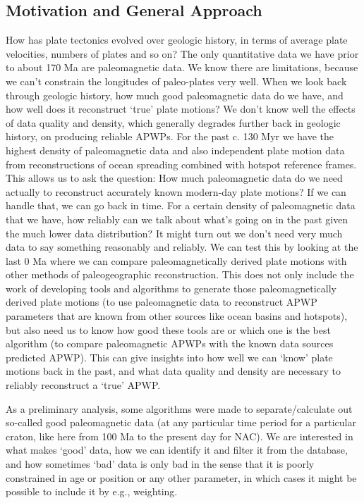 \subsection{Motivation and General Approach}

How has plate tectonics evolved over geologic history, in terms of average plate
velocities, numbers of plates and so on? The only quantitative data we have
prior to about 170 Ma are paleomagnetic data. We know there are limitations,
because we can't constrain the longitudes of paleo-plates very well. When we
look back through geologic history, how much good paleomagnetic data do we have,
and how well does it reconstruct `true' plate motions? We don't know well the
effects of data quality and density, which generally degrades further back in
geologic history, on producing reliable APWPs. For the past c. 130
Myr we have the highest density of paleomagnetic data and also independent plate
motion data from reconstructions of ocean spreading combined with hotspot
reference frames. This allows us to ask the question: How much paleomagnetic
data do we need actually to reconstruct accurately known modern-day plate
motions? If we can handle that, we can go back in time. For a certain density of
paleomagnetic data that we have, how reliably can we talk about what's going on
in the past given the much lower data distribution? It might turn out we don't
need very much data to say something reasonably and reliably. We can test this
by looking at the last 0 Ma where we can compare paleomagnetically
derived plate motions with other methods of paleogeographic reconstruction. This
does not only include the work of developing tools and algorithms to generate
those paleomagnetically derived plate motions (to use paleomagnetic data to
reconstruct APWP parameters that are known from other sources like ocean basins
and hotspots), but also need us to know how good these tools are or which one is
the best algorithm (to compare paleomagnetic APWPs with the known data sources
predicted APWP). This can give insights into how well we can `know' plate
motions back in the past, and what data quality and density are necessary to
reliably reconstruct a `true' APWP\@.

As a preliminary analysis, some algorithms were made to separate/calculate out
so-called good paleomagnetic data (at any particular time period for a
particular craton, like here from 100 Ma to the present day for NAC). We are
interested in what makes `good' data, how we can identify it and filter it from
the database, and how sometimes `bad' data is only bad in the sense that it is
poorly constrained in age or position or any other parameter, in which cases it
might be possible to include it by e.g., weighting.

